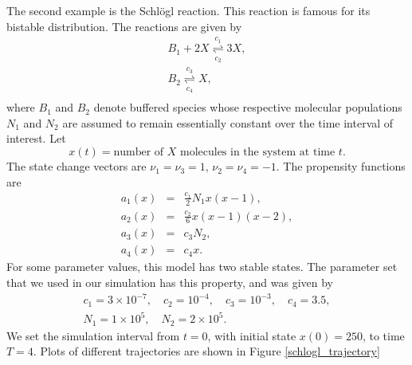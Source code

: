 \documentclass[12pt]{article}
\begin{document}
The second example is the Schl\"ogl reaction.
This reaction is famous for its bistable distribution.
The reactions are given by
\begin{equation}
\begin{array}{c}
B_1 + 2 X \underset{{c_2 }}{\overset{{c_1}}{\rightleftharpoons}} 3X, \\
B_2  \underset{{c_4 }}{\overset{{c_3}}{\rightleftharpoons}} X,  \\
\end{array}
\end{equation}
where $B_1$ and $B_2$ denote buffered species whose respective molecular
populations $N_1$ and $N_2$ are assumed to remain essentially constant
over the time interval of interest. Let
\begin{equation}
x(t) = \mbox{number of } X \mbox{ molecules in the system at time }t.
\end{equation}
The state change vectors are $\nu_1 = \nu_3 = 1$, $\nu_2 = \nu_4 = -1$. The propensity functions are
\begin{equation}
\begin{array}{rcl}
a_1(x) & = & \frac{c_1}{2} N_1 x (x - 1) , \\
a_2(x) & = & \frac{c_2}{6} x (x -1 ) ( x - 2), \\
a_3(x) & = & c_3 N_2 , \\
a_4(x) & = & c_4 x .
\end{array}
\end{equation}
For some parameter values, this model has two stable states. The parameter set that we used in our simulation has this property, and was given by
\begin{equation}
\begin{array}{c}
c_1 = 3\times 10^{-7}, \quad c_2 = 10^{-4}, \quad
c_3 = 10^{-3}, \quad c_4 = 3.5, \\
N_1 = 1 \times 10^5, \quad N_2 = 2 \times 10^5.
\end{array}
\end{equation}
We set the simulation interval from $t = 0$, with initial state $x(0) = 250$, to time $T = 4$.
Plots of different trajectories are shown in Figure \ref{schlogl_trajectory}
\end{document}
